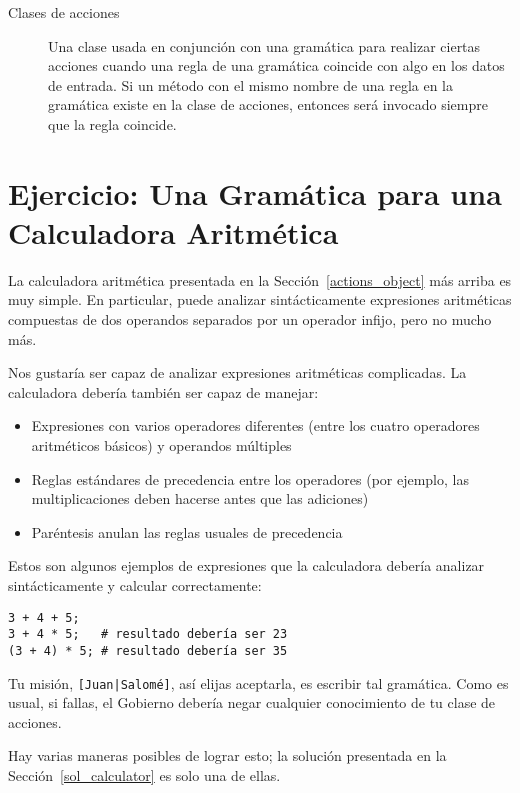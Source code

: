 \begin{description}
\item[Clases de acciones] Una clase usada en conjunción con una gramática
para realizar ciertas acciones cuando una regla de una gramática coincide
con algo en los datos de entrada. Si un método con el mismo nombre
de una regla en la gramática existe en la clase de acciones,
entonces será invocado siempre que la regla coincide.

\end{description}

\section{Ejercicio: Una Gramática para una Calculadora Aritmética}
\label{calculator}

La calculadora aritmética presentada en la Sección~\ref{actions_object}
más arriba es muy simple. En particular, puede analizar sintácticamente
expresiones aritméticas compuestas de dos operandos separados
por un operador infijo, pero no mucho más.

Nos gustaría ser capaz de analizar expresiones aritméticas complicadas.
La calculadora debería también ser capaz de manejar:
\begin{itemize}
\item Expresiones con varios operadores diferentes (entre los
cuatro operadores aritméticos básicos) y operandos múltiples
\item Reglas estándares de precedencia entre los operadores (por ejemplo,
las multiplicaciones deben hacerse antes que las adiciones)
\item Paréntesis anulan las reglas usuales de precedencia
\end{itemize}

Estos son algunos ejemplos de expresiones que la calculadora
debería analizar sintácticamente y calcular correctamente:
\begin{verbatim}
3 + 4 + 5;
3 + 4 * 5;   # resultado debería ser 23
(3 + 4) * 5; # resultado debería ser 35 
\end{verbatim}

\begin{exercise}
Tu misión, \verb'[Juan|Salomé]', así elijas aceptarla, es escribir
tal gramática. Como es usual, si fallas, el Gobierno debería negar
cualquier conocimiento de tu clase de acciones.

Hay varias maneras posibles de lograr esto; la solución 
presentada en la Sección~\ref{sol_calculator} es solo una de ellas.
\end{exercise}

